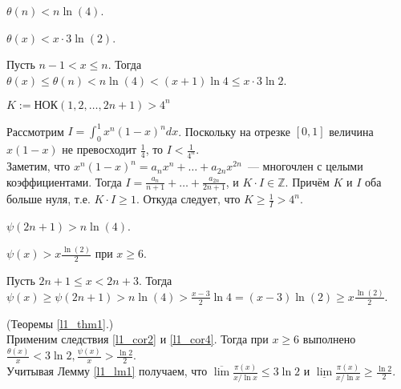 \begin{corollary} \label{l1_cor1}
    $\theta(n) < n \ln(4)$.
\end{corollary}

\begin{corollary} \label{l1_cor2}
    $\theta(x) < x \cdot 3 \ln(2)$.
\end{corollary}
\begin{pf}
    Пусть $n - 1 < x \leq n$. Тогда $\theta(x) \leq \theta(n) < n \ln(4) < (x + 1) \ln 4 \leq x \cdot 3\ln 2$.
\end{pf}

\begin{lemma} \label{l1_lm3}
    $K := \text{НОК}\left( 1, 2, \ldots, 2n + 1 \right) > 4^n$
\end{lemma}
\begin{pf}
    Рассмотрим $\displaystyle I = \int_{0}^{1} x^n (1 - x)^n dx$. Поскольку на отрезке $[0, 1]$ величина $x(1 - x)$ не превосходит $\displaystyle \frac{1}{4}$, то $\displaystyle I < \frac{1}{4^n}$.\\
    Заметим, что $x^n(1 - x)^n = a_n  x^n + \ldots + a_{2n} x^{2n}$ — многочлен с целыми коэффициентами. Тогда $\displaystyle I = \frac{a_n}{n + 1} + \ldots + \frac{a_{2n}}{2n + 1}$, и $K \cdot I \in \mathbb{Z}$. Причём $K$ и $I$ оба больше нуля, т.е. $K \cdot I \geq 1$. Откуда следует, что $\displaystyle K \geq \frac{1}{I} > 4^n$.
\end{pf}

\begin{corollary} \label{l1_cor3}
    $\psi(2n+1) > n \ln(4)$.
\end{corollary}

\begin{corollary} \label{l1_cor4}
    $\psi(x) > x \frac{\ln(2)}{2}$ при $x \geq 6$.
\end{corollary}
\begin{pf}
    Пусть $2n+1 \leq x < 2n+3$. Тогда
    $\displaystyle \psi(x) \geq \psi(2n+1) > n \ln(4) > \frac{x - 3}{2} \ln 4 = (x-3) \ln(2) \geq x \frac{\ln(2)}{2}$.
\end{pf}

\begin{pf} (Теоремы \ref{l1_thm1}.)~\\
    Применим следствия \ref{l1_cor2} и \ref{l1_cor4}. Тогда при $x \geq 6$ выполнено
	$\displaystyle  \frac{\theta(x)}{x} < 3 \ln 2, \frac{\psi(x)}{x} > \frac{\ln 2}{2}$.\\
    Учитывая Лемму \ref{l1_lm1} получаем, что $\displaystyle \overline{\lim} \frac{\pi(x)}{x / \ln x} \leq 3 \ln 2$ и
    $\displaystyle \underline{\lim} \frac{\pi(x)}{x / \ln x} \geq \frac{\ln 2}{2}$.
\end{pf}

